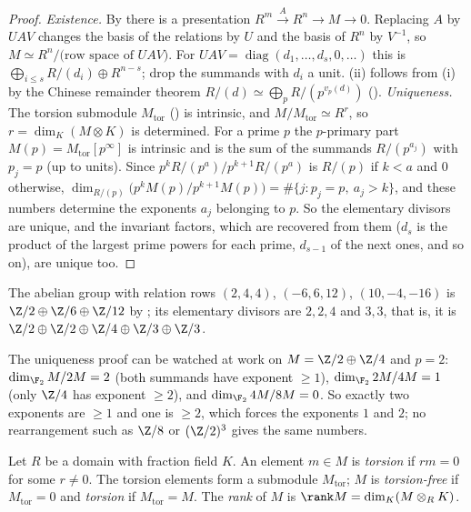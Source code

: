 \begin{proof}
\emph{Existence.} By  there is a presentation $R^m\xrightarrow{A}R^n\to M\to0$. Replacing $A$ by $UAV$ changes
the basis of the relations by $U$ and the basis of $R^n$ by $V^{-1}$, so $M\simeq R^n/\text{(row space of }UAV)$. For
$UAV=\operatorname{diag}(d_1,\dots,d_s,0,\dots)$ this is $\bigoplus_{i\le s}R/(d_i)\oplus R^{n-s}$; drop the summands with $d_i$ a unit. (ii) follows from
(i) by the Chinese remainder theorem $R/(d)\simeq\bigoplus_pR/(p^{v_p(d)})$ ().
\emph{Uniqueness.} The torsion submodule $M_{\mathrm{tor}}$ () is intrinsic, and $M/M_{\mathrm{tor}}\simeq R^r$, so
$r=\dim_K(M\otimes K)$ is determined. For a prime $p$ the $p$-primary part $M(p)=M_{\mathrm{tor}}[p^\infty]$ is intrinsic and is the sum of
the summands $R/(p^{a_j})$ with $p_j=p$ (up to units). Since $p^kR/(p^a)\big/p^{k+1}R/(p^a)$ is $R/(p)$ if $k<a$ and $0$ otherwise,
$\dim_{R/(p)}\bigl(p^kM(p)/p^{k+1}M(p)\bigr)=\#\{j:p_j=p,\ a_j>k\}$, and these numbers determine the exponents $a_j$ belonging to $p$. So the
elementary divisors are unique, and the invariant factors, which are recovered from them ($d_s$ is the product of the largest prime
powers for each prime, $d_{s-1}$ of the next ones, and so on), are unique too.
\end{proof}

\begin{example}\label{ex:modules:structure}
The abelian group with relation rows $(2,4,4)$, $(-6,6,12)$, $(10,-4,-16)$ is $\Z/2\oplus\Z/6\oplus\Z/12$ by ; its elementary
divisors are $2,2,4$ and $3,3$, that is, it is $\Z/2\oplus\Z/2\oplus\Z/4\oplus\Z/3\oplus\Z/3$.
\end{example}

The uniqueness proof can be watched at work on $M=\Z/2\oplus\Z/4$ and $p=2$: $\dim_{\F_2}M/2M=2$ (both summands have exponent $\ge1$),
$\dim_{\F_2}2M/4M=1$ (only $\Z/4$ has exponent $\ge2$), and $\dim_{\F_2}4M/8M=0$. So exactly two exponents are $\ge1$ and one is $\ge2$, which
forces the exponents $1$ and $2$; no rearrangement such as $\Z/8$ or $(\Z/2)^3$ gives the same numbers.

\begin{definition}[torsion]\label{def:modules:torsion}
Let $R$ be a domain with fraction field $K$. An element $m\in M$ is \emph{torsion} if $rm=0$ for some $r\ne0$. The torsion elements
form a submodule $M_{\mathrm{tor}}$; $M$ is \emph{torsion-free} if $M_{\mathrm{tor}}=0$ and \emph{torsion} if $M_{\mathrm{tor}}=M$. The \emph{rank} of $M$ is
$\rank M=\dim_K(M\otimes_RK)$.
\end{definition}

